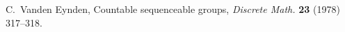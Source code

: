 \documentclass[12pt,a4paper]{article}
\newcommand{\Z}{\mathbb{Z}}
\begin{document}
\begin{thebibliography}{99}



C.~Vanden Eynden, Countable sequenceable groups, {\em Discrete Math.} {\bf 23} (1978) 317--318.








\end{thebibliography}
\end{document}
